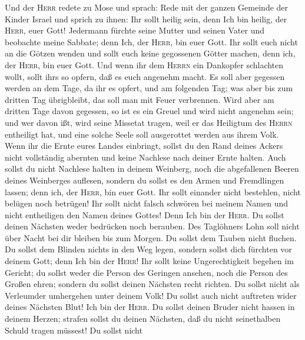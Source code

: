  Und der \textsc{Herr} redete zu Mose und sprach:
 Rede mit der ganzen Gemeinde der Kinder Israel und sprich
zu ihnen: Ihr sollt heilig sein, denn Ich bin heilig, der \textsc{Herr},
euer Gott!  Jedermann fürchte seine Mutter und seinen
Vater und beobachte meine Sabbate; denn Ich, der \textsc{Herr}, bin euer
Gott.  Ihr sollt euch nicht an die Götzen wenden und sollt
euch keine gegossenen Götter machen, denn ich, der \textsc{Herr}, bin
euer Gott.  Und wenn ihr dem \textsc{Herrn} ein Dankopfer
schlachten wollt, sollt ihr\textquotesingle s so opfern, daß es euch
angenehm macht.  Es soll aber gegessen werden an dem Tage,
da ihr es opfert, und am folgenden Tag; was aber bis zum dritten Tag
übrigbleibt, das soll man mit Feuer verbrennen.  Wird aber
am dritten Tage davon gegessen, so ist es ein Greuel und wird nicht
angenehm sein;  und wer davon ißt, wird seine Missetat
tragen, weil er das Heiligtum des \textsc{Herrn} entheiligt hat, und
eine solche Seele soll ausgerottet werden aus ihrem Volk. 
Wenn ihr die Ernte eures Landes einbringt, sollst du den Rand deines
Ackers nicht vollständig abernten und keine Nachlese nach deiner Ernte
halten.  Auch sollst du nicht Nachlese halten in deinem
Weinberg, noch die abgefallenen Beeren deines Weinberges auflesen,
sondern du sollst es den Armen und Fremdlingen lassen; denn ich, der
\textsc{Herr}, bin euer Gott.  Ihr sollt einander nicht
bestehlen, nicht belügen noch betrügen!  Ihr sollt nicht
falsch schwören bei meinem Namen und nicht entheiligen den Namen deines
Gottes! Denn Ich bin der \textsc{Herr}.  Du sollst deinen
Nächsten weder bedrücken noch berauben. Des Taglöhners Lohn soll nicht
über Nacht bei dir bleiben bis zum Morgen.  Du sollst dem
Tauben nicht fluchen. Du sollst dem Blinden nichts in den Weg legen,
sondern sollst dich fürchten vor deinem Gott; denn Ich bin der
\textsc{Herr}!  Ihr sollt keine Ungerechtigkeit begehen
im Gericht; du sollst weder die Person des Geringen ansehen, noch die
Person des Großen ehren; sondern du sollst deinen Nächsten recht
richten.  Du sollst nicht als Verleumder umhergehen unter
deinem Volk! Du sollst auch nicht auftreten wider deines Nächsten Blut!
 Ich bin der \textsc{Herr}. Du sollst deinen Bruder nicht
hassen in deinem Herzen; strafen sollst du deinen Nächsten, daß du nicht
seinethalben Schuld tragen müssest!  Du sollst nicht
